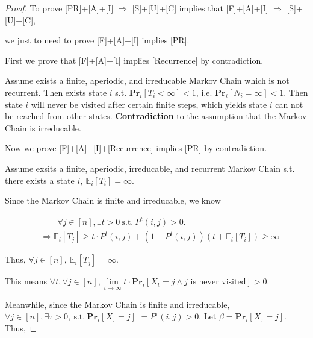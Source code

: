 \documentclass{article}
\renewcommand{\Pr}[2]{\mathbf{Pr}_{#1}\left[#2\right]}
\newcommand{\staExp}[2]{\mathbb{E}_{#1}\left[#2\right]}
\begin{document}
\begin{proof}
    To prove [PR]+[A]+[I] $\Rightarrow$ [S]+[U]+[C] implies that [F]+[A]+[I] $\Rightarrow$ [S]+[U]+[C], 
    
    \hspace{3.9em}
    we just to need to prove [F]+[A]+[I] implies [PR].
    
    \hspace{1.3em}
    First we prove that [F]+[A]+[I] implies [Recurrence] by contradiction.
    
    \hspace{1.3em}
    Assume exists a finite, aperiodic, and irreducable Markov Chain which is not recurrent. Then exists state $i$ s.t. $\Pr{i}{T_i<\infty}<1$, i.e. $\Pr{i}{N_i=\infty}<1.$ Then state $i$ will never be visited after certain finite steps, which yields state $i$ can not be reached from other states. \underline{\textbf{Contradiction}} to the assumption that the Markov Chain is irreducable.
    
    \vspace{1em} \hspace{1.3em}
    Now we prove [F]+[A]+[I]+[Recurrence] implies [PR] by contradiction.
    
    \hspace{1.3em}
    Assume exsits a finite, aperiodic, irreducable, and recurrent Markov Chain s.t. there exists a state $i,\  \staExp{i}{T_i}=\infty.$ 
    
    \hspace{1.3em}
    Since the Markov Chain is finite and irreducable, we know 
    
    \vspace{-3em}
    \begin{align*}
        &\qquad\forall j\in [n], \exists t>0\ \mathrm{s.t.}\ P^t(i,j)>0. \\
        &\Longrightarrow \staExp{i}{T_j} \geq t\cdot P^t(i,j) + \left(1-P^t(i,j)\right)(t+\staExp{i}{T_i}) \geq \infty
    \end{align*}
    
    \vspace{-1em} \hspace{1.3em}
    Thus, $\forall j\in [n],\ \staExp{i}{T_j}=\infty.$
    
    \hspace{1.3em}
    This means $\forall t, \forall j\in[n], \underset{t\rightarrow \infty}{\lim}t\cdot\Pr{i}{X_t=j \land \text{$j$ is never visited}}>0$.
    
    \hspace{1.3em}
    Meanwhile, since the Markov Chain is finite and irreducable, $\forall j\in [n], \exists \tau>0,\ \mathrm{s.t.}\ \Pr{i}{X_\tau=j}$ $= P^\tau(i,j) > 0.$ Let $\beta=\Pr{i}{X_\tau=j}$. Thus, 
    

\end{proof}
\end{document}
